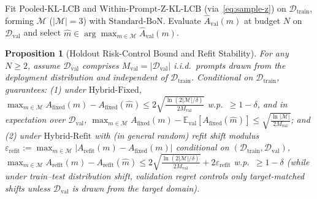\documentclass[10pt]{article}
\theoremstyle{plain}
\newtheorem{proposition}{Proposition}
\theoremstyle{definition}
\theoremstyle{remark}
\newcommand{\E}{\mathbb{E}}
\begin{document}
\begin{algorithm}[htbp]
\caption{Minimal Three-Branch Holdout Risk-Control Baseline ($\mathrm{Hybrid\text{-}Fixed}$ vs.\ $\mathrm{Hybrid\text{-}Refit}$)}
\label{alg:hybrid-fixed}
\DontPrintSemicolon
{}
Fit $\mathrm{Pooled\text{-}KL\text{-}LCB}$ and $\mathrm{Within\text{-}Prompt\text{-}Z\text{-}KL\text{-}LCB}$ (via~\eqref{eq:sample-z}) on $\mathcal{D}_{\mathrm{train}}$, forming $\mathcal{M}$ ($|\mathcal{M}| = 3$) with $\mathrm{Standard\text{-}BoN}$.\;
Evaluate $\hat{A}_{\mathrm{val}}(m)$ at budget $N$ on $\mathcal{D}_{\mathrm{val}}$ and select $\hat{m} \in \arg\max_{m \in \mathcal{M}} \hat{A}_{\mathrm{val}}(m)$.\;
\end{algorithm}

\begin{proposition}[Holdout Risk-Control Bound and Refit Stability]
\label{prop:hybrid}
For any $N \ge 2$, assume $\mathcal{D}_{\mathrm{val}}$ comprises $M_{\mathrm{val}} = |\mathcal{D}_{\mathrm{val}}|$ i.i.d.\ prompts drawn from the deployment distribution and independent of $\mathcal{D}_{\mathrm{train}}$. Conditional on $\mathcal{D}_{\mathrm{train}}$,  guarantees: (1) under $\mathrm{Hybrid\text{-}Fixed}$, $\max_{m\in\mathcal{M}} A_{\mathrm{fixed}}(m) - A_{\mathrm{fixed}}(\hat{m}) \le 2\sqrt{\frac{\ln(2|\mathcal{M}|/\delta)}{2 M_{\mathrm{val}}}}$ w.p.\ $\ge 1 - \delta$, and in expectation over $\mathcal{D}_{\mathrm{val}}$, $\max_{m\in\mathcal{M}} A_{\mathrm{fixed}}(m) - \E_{\mathrm{val}}[A_{\mathrm{fixed}}(\hat{m})] \le \sqrt{\frac{\ln|\mathcal{M}|}{2 M_{\mathrm{val}}}}$; and (2) under $\mathrm{Hybrid\text{-}Refit}$ with (in general random) refit shift modulus $\varepsilon_{\mathrm{refit}} := \max_{m\in\mathcal{M}}|A_{\mathrm{refit}}(m) - A_{\mathrm{fixed}}(m)|$ conditional on $(\mathcal{D}_{\mathrm{train}}, \mathcal{D}_{\mathrm{val}})$, $\max_{m\in\mathcal{M}} A_{\mathrm{refit}}(m) - A_{\mathrm{refit}}(\hat{m}) \le 2\sqrt{\frac{\ln(2|\mathcal{M}|/\delta)}{2 M_{\mathrm{val}}}} + 2\varepsilon_{\mathrm{refit}}$ w.p.\ $\ge 1 - \delta$ (while under train--test distribution shift, validation regret controls only target-matched shifts unless $\mathcal{D}_{\mathrm{val}}$ is drawn from the target domain).
\end{proposition}
\end{document}
